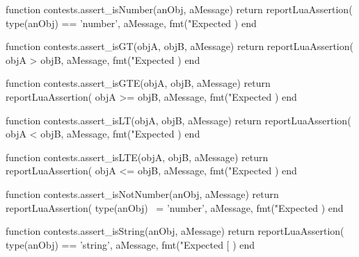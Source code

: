 \stopTestSuite


\startLuaCode
function contests.assert_isNumber(anObj, aMessage)
  return reportLuaAssertion(
    type(anObj) == 'number',
    aMessage,
    fmt("Expected %
  )
end
\stopLuaCode

\stopTestSuite


\startLuaCode
function contests.assert_isGT(objA, objB, aMessage)
  return reportLuaAssertion(
    objA > objB,
    aMessage,
    fmt("Expected %
  )
end
\stopLuaCode

\stopTestSuite


\startLuaCode
function contests.assert_isGTE(objA, objB, aMessage)
  return reportLuaAssertion(
    objA >= objB,
    aMessage,
    fmt("Expected %
  )
end
\stopLuaCode

\stopTestSuite


\startLuaCode
function contests.assert_isLT(objA, objB, aMessage)
  return reportLuaAssertion(
    objA < objB,
    aMessage,
    fmt("Expected %
  )
end
\stopLuaCode

\stopTestSuite


\startLuaCode
function contests.assert_isLTE(objA, objB, aMessage)
  return reportLuaAssertion(
    objA <= objB,
    aMessage,
    fmt("Expected %
  )
end
\stopLuaCode


\stopTestSuite


\startLuaCode
function contests.assert_isNotNumber(anObj, aMessage)
  return reportLuaAssertion(
    type(anObj) ~= 'number',
    aMessage,
    fmt("Expected %
  )
end
\stopLuaCode

\stopTestSuite


\startLuaCode
function contests.assert_isString(anObj, aMessage)
  return reportLuaAssertion(
    type(anObj) == 'string',
    aMessage,
    fmt("Expected [%
  )
end
\stopLuaCode

